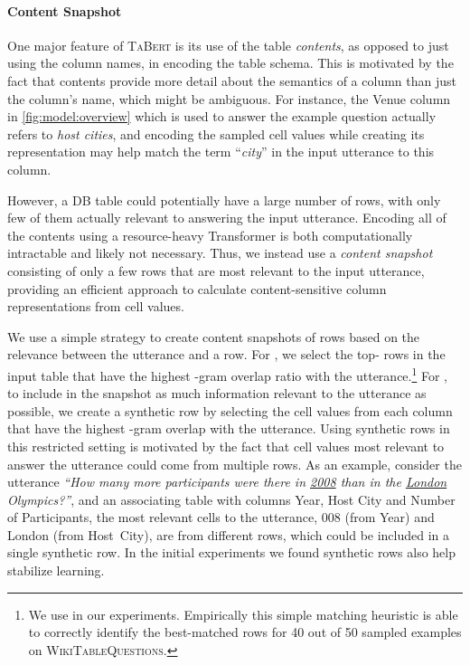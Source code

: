 \documentclass[11pt,a4paper]{article}
\def\model/{\textsc{TaBert}}
\renewcommand{\tt}[1]{\fontfamily{cmtt}\selectfont #1}
\def\wtq/{\textsc{WikiTableQuestions}}
\begin{document}
\paragraph{Content Snapshot}
One major feature of \model/ is its use of the table \emph{contents}, as opposed to just using the column names, in encoding the table schema.
This is motivated by the fact that contents provide more detail about the semantics of a column than just the column's name, which might be ambiguous.
For instance, the {\tt Venue} column in \autoref{fig:model:overview} which is used to answer the example question actually refers to \textit{host cities}, and encoding the sampled cell values while creating 
its representation may help 
match the term ``\textit{city}'' in the input utterance to this column.


However, a DB table could potentially have a large number of rows, with only few of them actually relevant to answering the input utterance.
Encoding all of the contents using a resource-heavy Transformer is both computationally intractable and likely not necessary.
Thus, we instead use a \emph{content snapshot} consisting of only a few rows that are most relevant to the input utterance, providing an efficient approach to calculate content-sensitive column representations from cell values. 


We use a simple strategy to create content snapshots of  rows based on the relevance between the utterance and a row.
For , we select the top- rows in the input table that have the highest -gram overlap ratio with the utterance.\footnote{We use  in our experiments. Empirically this simple matching heuristic is able to correctly identify the best-matched rows for 40 out of 50 sampled examples on \wtq/.} 
For , to include in the snapshot as much information relevant to the utterance as possible, we create a synthetic row by selecting the cell values from each column that have the highest -gram overlap with the utterance.
Using synthetic rows in this restricted setting is motivated by the fact that cell values most relevant to answer the utterance could come from multiple rows.
As an example, consider the utterance \textit{``How many more participants were there in \underline{2008} than in the \underline{London} Olympics?''}, and an associating table with columns {\tt Year}, {\tt Host City} and {\tt Number of Participants}, 
the most relevant cells to the utterance, {\tt 2008} (from {\tt Year}) and {\tt London} (from {\tt Host~City}), are from different rows, which could be included in a single synthetic row.
In the initial experiments we found synthetic rows also help stabilize learning.
\end{document}
